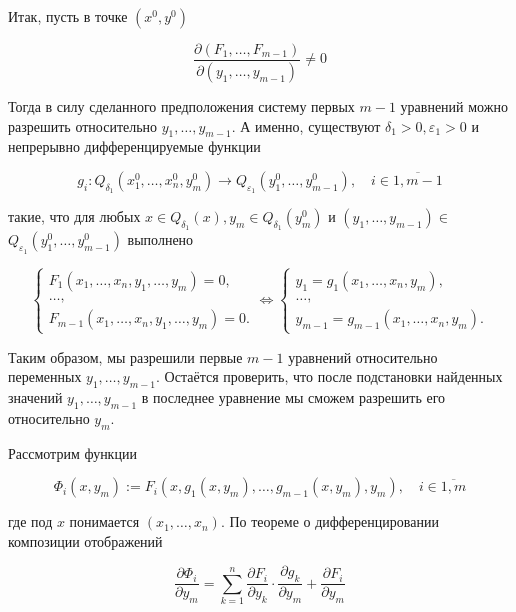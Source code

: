 \documentclass[a4paper,12pt]{article} %
\begin{document}
Итак, пусть в точке $\left(x^{0}, y^{0}\right)$

$$
\frac{\partial\left(F_{1}, \ldots, F_{m-1}\right)}{\partial\left(y_{1}, \ldots, y_{m-1}\right)} \neq 0
$$

Тогда в силу сделанного предположения систему первых $m-1$ уравнений можно разрешить относительно $y_{1}, \ldots, y_{m-1}$. А именно, существуют $\delta_{1}>0, \varepsilon_{1}>0$ и непрерывно дифференцируемые функции

$$
g_{i}: Q_{\delta_{1}}\left(x_{1}^{0}, \ldots, x_{n}^{0}, y_{m}^{0}\right) \rightarrow Q_{\varepsilon_{1}}\left(y_{1}^{0}, \ldots, y_{m-1}^{0}\right), \quad i \in \overline{1, m-1}
$$

такие, что для любых $x \in Q_{\delta_{1}}(x), y_{m} \in Q_{\delta_{1}}\left(y_{m}^{0}\right)$ и $\left(y_{1}, \ldots, y_{m-1}\right) \in$ $Q_{\varepsilon_{1}}\left(y_{1}^{0}, \ldots, y_{m-1}^{0}\right)$ выполнено

$$
\left\{\begin{array} { l } 
{ F _ { 1 } ( x _ { 1 } , \ldots , x _ { n } , y _ { 1 } , \ldots , y _ { m } ) = 0 , } \\
{ \ldots , } \\
{ F _ { m - 1 } ( x _ { 1 } , \ldots , x _ { n } , y _ { 1 } , \ldots , y _ { m } ) = 0 . }
\end{array} \Leftrightarrow \left\{\begin{array}{l}
y_{1}=g_{1}\left(x_{1}, \ldots, x_{n}, y_{m}\right), \\
\ldots, \\
y_{m-1}=g_{m-1}\left(x_{1}, \ldots, x_{n}, y_{m}\right) .
\end{array}\right.\right.
$$

Таким образом, мы разрешили первые $m-1$ уравнений относительно переменных $y_{1}, \ldots, y_{m-1}$. Остаётся проверить, что после подстановки найденных значений $y_{1}, \ldots, y_{m-1}$ в последнее уравнение мы сможем разрешить его относительно $y_{m}$.

Рассмотрим функции

$$
\Phi_{i}\left(x, y_{m}\right):=F_{i}\left(x, g_{1}\left(x, y_{m}\right), \ldots, g_{m-1}\left(x, y_{m}\right), y_{m}\right), \quad i \in \overline{1, m}
$$

где под $x$ понимается $\left(x_{1}, \ldots, x_{n}\right)$. По теореме о дифференцировании композиции отображений

$$
\frac{\partial \Phi_{i}}{\partial y_{m}}=\sum_{k=1}^{n} \frac{\partial F_{i}}{\partial y_{k}} \cdot \frac{\partial g_{k}}{\partial y_{m}}+\frac{\partial F_{i}}{\partial y_{m}}
$$
\end{document}
